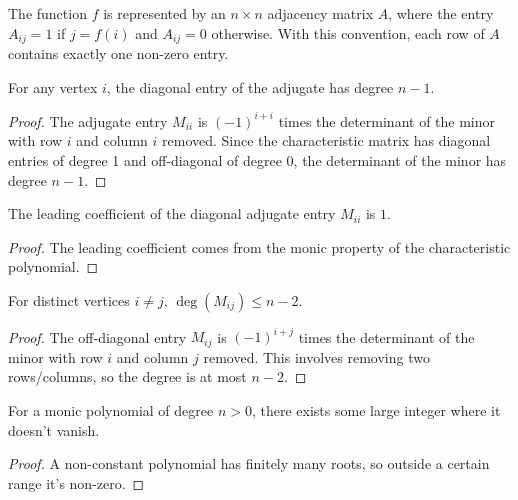 \begin{definition}
\leanok
The function $f$ is represented by an $n \times n$ adjacency matrix $A$, where the entry $A_{ij} = 1$ if $j=f(i)$ and $A_{ij}=0$ otherwise. With this convention, each row of $A$ contains exactly one non-zero entry.
\end{definition}

\begin{lemma}
For any vertex $i$, the diagonal entry of the adjugate has degree $n-1$.
\end{lemma}

\begin{proof}
The adjugate entry $M_{ii}$ is $(-1)^{i+i}$ times the determinant of the minor with row $i$ and column $i$ removed.
Since the characteristic matrix has diagonal entries of degree 1 and off-diagonal of degree 0,
the determinant of the minor has degree $n-1$.
\end{proof}

\begin{lemma}
The leading coefficient of the diagonal adjugate entry $M_{ii}$ is $1$.
\end{lemma}

\begin{proof}
The leading coefficient comes from the monic property of the characteristic polynomial.
\end{proof}

\begin{lemma}
For distinct vertices $i \neq j$, $\deg(M_{ij}) \leq n-2$.
\end{lemma}

\begin{proof}
The off-diagonal entry $M_{ij}$ is $(-1)^{i+j}$ times the determinant of the minor with row $i$ and column $j$ removed.
This involves removing two rows/columns, so the degree is at most $n-2$.
\end{proof}

\begin{lemma}
For a monic polynomial of degree $n > 0$, there exists some large integer where it doesn't vanish.
\end{lemma}

\begin{proof}
A non-constant polynomial has finitely many roots, so outside a certain range it's non-zero.
\end{proof}

